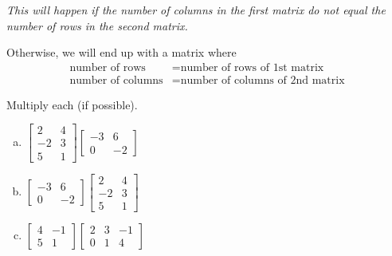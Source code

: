 \documentclass{article}
\begin{document}
\emph{This will happen if the number of columns in the first matrix do not equal the number of rows in the second matrix.}    
\bigskip 

Otherwise, we will end up with a matrix where 
\begin{align*}
    \text{number of rows} &= \text{number of rows of 1st matrix} \\
    \text{number of columns} &= \text{number of columns of 2nd matrix}
\end{align*}
\bigskip 

\begin{example} 
Multiply each (if possible).
\end{example}
\begin{enumerate}[(a)]
    \item 
    $\begin{bmatrix}
        2 & 4 \\ -2 & 3 \\ 5 & 1
    \end{bmatrix}
    \begin{bmatrix}
        -3 & 6 \\ 0 & -2 
    \end{bmatrix}$
    \newpage  
    
    \item 
    $\begin{bmatrix}
        -3 & 6 \\ 0 & -2 
    \end{bmatrix}
    \begin{bmatrix} 
        2 & 4 \\ -2 & 3 \\ 5 & 1
    \end{bmatrix}$
    \vfill  
    
    \item 
    $\begin{bmatrix}
        4 & -1 \\ 5 & 1 
    \end{bmatrix}
    \begin{bmatrix}
        2 & 3 & -1 \\ 0 & 1 & 4
    \end{bmatrix}$
    \vfill 
    
\end{enumerate}




 
 
\end{document}
